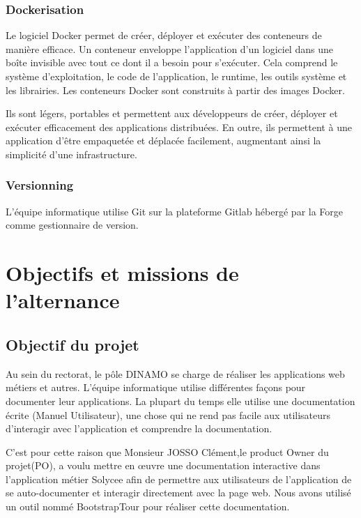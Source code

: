\documentclass[a4paper]{article}
\begin{document}
\subsubsection{Dockerisation}

Le logiciel Docker permet de créer, déployer et exécuter des conteneurs de manière efficace. Un conteneur enveloppe l’application d’un logiciel dans une boîte invisible avec tout ce dont il a besoin pour s’exécuter. Cela comprend le
système d’exploitation, le code de l’application, le runtime, les outils système et les librairies. Les conteneurs Docker sont construits à partir des images Docker.

Ils sont légers, portables et permettent aux développeurs de créer, déployer et exécuter efficacement des applications distribuées. En outre, ils permettent à une application d’être empaquetée et déplacée facilement, augmentant ainsi la simplicité d’une infrastructure.

\subsubsection{Versionning}

L'équipe informatique utilise Git sur la plateforme Gitlab hébergé par la Forge comme gestionnaire de version. 


\section{Objectifs et missions de l'alternance}

\subsection{Objectif du projet}

Au sein du rectorat, le pôle DINAMO se charge de réaliser les applications web métiers et autres. L'équipe informatique utilise différentes façons pour documenter leur applications. La plupart du temps elle utilise une documentation écrite (Manuel Utilisateur), une chose qui ne rend pas facile aux utilisateurs d’interagir avec l'application et comprendre la documentation. 


C'est pour cette raison que Monsieur JOSSO Clément,le product Owner du projet(PO), a voulu mettre en œuvre une documentation interactive dans l'application métier Solycee afin de permettre aux utilisateurs de l'application de se auto-documenter et interagir directement avec la page web. Nous avons utilisé un outil nommé BootstrapTour pour réaliser cette documentation. 
\end{document}
